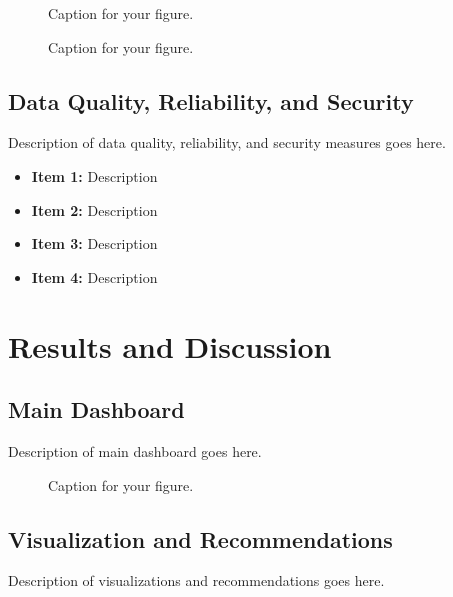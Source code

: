 \documentclass[12pt]{article}
\begin{document}
\begin{figure}[h!]
\centering
\caption{Caption for your figure.}
\label{fig:rule_strength}
\end{figure}

\begin{figure}[h!]
\centering
\caption{Caption for your figure.}
\label{fig:defuzzification}
\end{figure}

\subsection{Data Quality, Reliability, and Security}

Description of data quality, reliability, and security measures goes here.

\begin{itemize}
    \item \textbf{Item 1:} Description
    \item \textbf{Item 2:} Description
    \item \textbf{Item 3:} Description
    \item \textbf{Item 4:} Description
\end{itemize}

\section{Results and Discussion}

\subsection{Main Dashboard}

Description of main dashboard goes here.

\begin{figure}[htbp]
    \centering
    \caption{Caption for your figure.}
    \label{fig:dashboard}
\end{figure}

\subsection{Visualization and Recommendations}

Description of visualizations and recommendations goes here.
\end{document}
